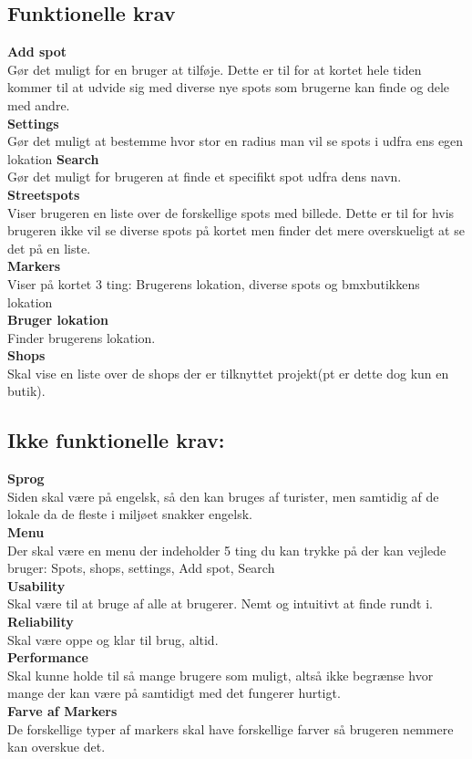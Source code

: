 \documentclass[12pt]{article}
\begin{document}
\subsection*{Funktionelle krav}
\textbf{Add spot} \\ Gør det muligt for en bruger at tilføje. Dette er til for at kortet hele tiden kommer til at udvide sig med diverse nye spots som brugerne kan finde og dele med andre.\\
\textbf{Settings}\\ Gør det muligt at bestemme hvor stor en radius man vil se spots i udfra ens egen lokation
\textbf{Search}\\ Gør det muligt for brugeren at finde et specifikt spot udfra dens navn.
\textbf{Streetspots}\\ Viser brugeren en liste over de forskellige spots med billede. Dette er til for hvis brugeren ikke vil se diverse spots på kortet men finder det mere overskueligt at se det på en liste.\\
\textbf{Markers}\\ Viser på kortet 3 ting: Brugerens lokation, diverse spots og bmxbutikkens lokation\\
\textbf{Bruger lokation}\\ Finder brugerens lokation.\\
\textbf{Shops}\\ Skal vise en liste over de shops der er tilknyttet projekt(pt er dette dog kun en butik).
\subsection*{Ikke funktionelle krav:}
\textbf{Sprog}\\ Siden skal være på engelsk, så den kan bruges af turister, men samtidig af de lokale da de fleste i miljøet snakker engelsk.\\
\textbf{Menu}\\ Der skal være en menu der indeholder 5 ting du kan trykke på der kan vejlede bruger: Spots, shops, settings, Add spot, Search\\
\textbf{Usability}\\ Skal være til at bruge af alle at brugerer. Nemt og intuitivt at finde rundt i.
\textbf{Reliability}\\ Skal være oppe og klar til brug, altid.\\
\textbf{Performance}\\ Skal kunne holde til så mange brugere som muligt, altså ikke begrænse hvor mange der kan være på samtidigt med det fungerer hurtigt. \\
\textbf{Farve af Markers}\\ De forskellige typer af markers skal have forskellige farver så brugeren nemmere kan overskue det.
\end{document}
